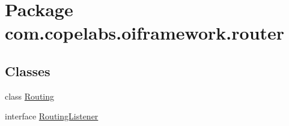 \hypertarget{namespacecom_1_1copelabs_1_1oiframework_1_1router}{}\section{Package com.\+copelabs.\+oiframework.\+router}
\label{namespacecom_1_1copelabs_1_1oiframework_1_1router}
\subsection*{Classes}
\begin{DoxyCompactItemize}
\item 
class \hyperlink{classcom_1_1copelabs_1_1oiframework_1_1router_1_1_routing}{Routing}
\item 
interface \hyperlink{interfacecom_1_1copelabs_1_1oiframework_1_1router_1_1_routing_listener}{Routing\+Listener}
\end{DoxyCompactItemize}
